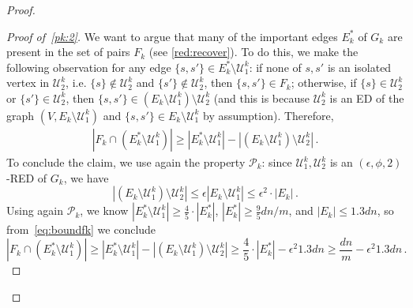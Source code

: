 \begin{proof}
\begin{proof}[Proof of~\eqref{pk:2}]
		We want to argue that many of the important edges $E^*_k$ of $G_k$ are present in the set of pairs $F_k$ (see \cref{red:recover}). To do this, we make the following observation for any edge $\{s,s'\} \in E^*_k \setminus \mathcal{U}^k_1 $: if none of $s,s'$ is an isolated vertex in $\mathcal{U}_2^k$, i.e. $\{s\} \notin \mathcal{U}_2^k$ and $\{s'\} \notin \mathcal{U}_2^k$, then $\{s,s'\} \in F_k$; otherwise, if $\{s\} \in \mathcal{U}_2^k$ or $\{s'\} \in \mathcal{U}_2^k$, then $\{s,s'\} \in(E_k \setminus \mathcal{U}_1^k) \setminus \mathcal{U}_2^k$ (and this is because  $\mathcal{U}_2^k$ is an ED of the graph $(V,E_k \setminus \mathcal{U}_1^k)$ and $\{s,s'\} \in E_k \setminus \mathcal{U}_1^k$ by assumption). Therefore,
		\begin{align}
			\label{eq:boundfk}
			|F_k \cap (E^*_k \setminus \mathcal{U}^k_1)| \ge |E^*_k \setminus \mathcal{U}^k_1| - |(E_k \setminus \mathcal{U}_1^k) \setminus \mathcal{U}_2^k| \, .
		\end{align}
		To conclude the claim, we use again the property $\mathcal{P}_k$: since $\mathcal{U}_1^k,\mathcal{U}_2^k$ is an $(\epsilon,\phi,2)$-RED of  $G_k$, we have
		\begin{equation*}
			\left|(E_k \setminus \mathcal{U}_1^k) \setminus \mathcal{U}_2^k \right| \le \epsilon |E_k \setminus \mathcal{U}_1^k| \le \epsilon^2 \cdot |E_k| \, .
		\end{equation*}
		Using again $\mathcal{P}_k$, we know $| E^*_k \setminus \mathcal{U}^k_1| \ge \frac{4}{5} \cdot |E^*_k|$,  $|E_k^*| \ge \frac{9}{5}{dn}/{m}$,  and $|E_k| \le  1.3 dn$, so from~\eqref{eq:boundfk} we conclude
		\begin{equation}
			|F_k \cap (E^*_k \setminus \mathcal{U}^k_1)| \ge |E^*_k \setminus \mathcal{U}^k_1| - |(E_k \setminus \mathcal{U}_1^k) \setminus \mathcal{U}_2^k| \ge  \frac{4}{5} \cdot |E^*_k|- \epsilon^2 1.3 dn \ge \frac{dn}{m}- \epsilon^2 1.3 dn\, .
		\end{equation}
	\end{proof}
	

\end{proof}
